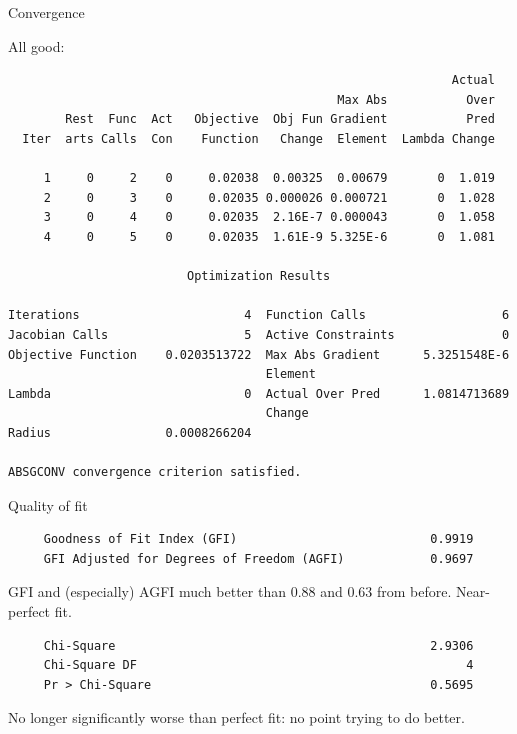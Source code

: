\documentclass[pdf]{prosper}
\begin{document}
  \begin{slide}{Convergence}

All good:
{\scriptsize
\begin{verbatim}
                                                              Actual
                                              Max Abs           Over
        Rest  Func  Act   Objective  Obj Fun Gradient           Pred
  Iter  arts Calls  Con    Function   Change  Element  Lambda Change

     1     0     2    0     0.02038  0.00325  0.00679       0  1.019
     2     0     3    0     0.02035 0.000026 0.000721       0  1.028
     3     0     4    0     0.02035  2.16E-7 0.000043       0  1.058
     4     0     5    0     0.02035  1.61E-9 5.325E-6       0  1.081

                         Optimization Results

Iterations                       4  Function Calls                   6
Jacobian Calls                   5  Active Constraints               0
Objective Function    0.0203513722  Max Abs Gradient      5.3251548E-6
                                    Element                           
Lambda                           0  Actual Over Pred      1.0814713689
                                    Change                            
Radius                0.0008266204                                    

ABSGCONV convergence criterion satisfied.                             

\end{verbatim}
}
    
  \end{slide}

  \begin{slide}{Quality of fit}

{\scriptsize
\begin{verbatim}
     Goodness of Fit Index (GFI)                           0.9919
     GFI Adjusted for Degrees of Freedom (AGFI)            0.9697

\end{verbatim}
}

GFI and (especially) AGFI much better than 0.88 and 0.63 from before. Near-perfect fit.

{\scriptsize
\begin{verbatim}
     Chi-Square                                            2.9306
     Chi-Square DF                                              4
     Pr > Chi-Square                                       0.5695

\end{verbatim}
}

No longer significantly worse than perfect fit: no point trying to do better.
    
  \end{slide}
\end{document}
